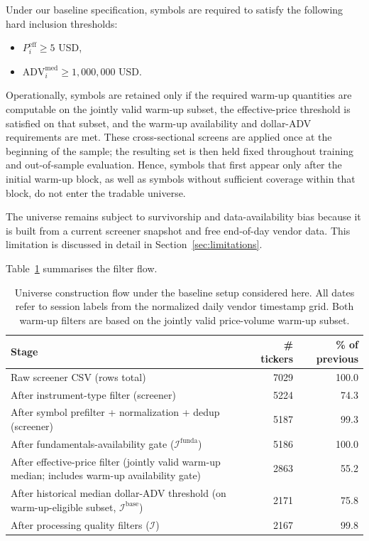 \documentclass[11pt,a4paper]{article}
\begin{document}
Under our baseline specification, symbols are required to satisfy the following
hard inclusion thresholds:
\begin{itemize}
  \item $P_i^{\mathrm{eff}} \ge 5$ USD,
  \item $\mathrm{ADV}^{\mathrm{med}}_i \ge 1{,}000{,}000$ USD.
\end{itemize}
Operationally, symbols are retained only if the required warm-up quantities are
computable on the jointly valid warm-up subset, the effective-price threshold is
satisfied on that subset, and the warm-up availability and dollar-ADV
requirements are met.
These cross-sectional screens are applied once at the beginning of the sample;
the resulting set is then held fixed throughout training and out-of-sample
evaluation. Hence, symbols that first appear only after the initial warm-up block, as well as symbols without sufficient coverage within that block, do not enter the tradable universe.

The universe remains subject to survivorship and data-availability bias because
it is built from a current screener snapshot and free end-of-day vendor data.
This limitation is discussed in detail in Section~\ref{sec:limitations}.

Table~\ref{tab:universe_filters} summarises the filter flow.

\begin{table}[!htbp]
  \centering
  \caption{Universe construction flow under the baseline setup considered here. All dates refer to session labels from the normalized daily vendor timestamp grid. Both warm-up filters are based on the jointly valid price-volume warm-up subset.}
  \label{tab:universe_filters}
  \begin{tabularx}{\linewidth}{Xrr}
    \toprule
    Stage & \# tickers & \% of previous \\
    \midrule
    Raw screener CSV (rows total) & 7029 & 100.0 \\
    After instrument-type filter (screener) & 5224 & 74.3 \\
    After symbol prefilter + normalization + dedup (screener) & 5187 & 99.3 \\
    After fundamentals-availability gate ($\mathcal{I}^{\mathrm{funda}}$) & 5186 & 100.0 \\
    After effective-price filter (jointly valid warm-up median; includes warm-up availability gate) & 2863 & 55.2 \\
    After historical median dollar-ADV threshold (on warm-up-eligible subset, $\mathcal{I}^{\mathrm{base}}$) & 2171 & 75.8 \\
    After processing quality filters ($\mathcal{I}$) & 2167 & 99.8 \\
    \bottomrule
  \end{tabularx}
\end{table}
\end{document}

